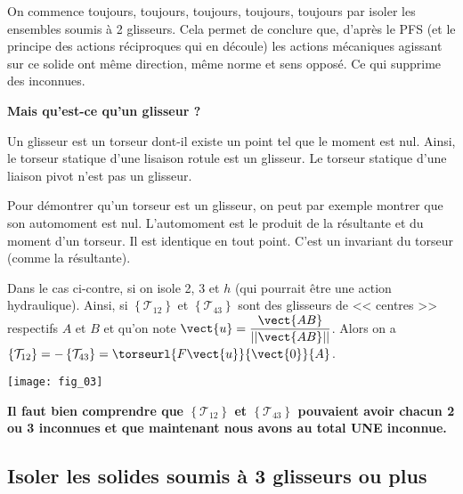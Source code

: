 On commence toujours, \large{toujours}, \Large{toujours}, \LARGE{toujours}, \huge{toujours} \normalsize par isoler les ensembles soumis à 2 glisseurs. Cela permet de conclure que, d'après le PFS (et le principe des actions réciproques qui en découle) les actions mécaniques agissant sur ce solide ont même direction, même norme et sens opposé. Ce qui supprime des inconnues.

\textbf{Mais qu'est-ce qu'un glisseur ?}

Un glisseur est un torseur dont-il existe un point tel que le moment est nul. Ainsi, le torseur statique d'une lisaison rotule est un glisseur. Le torseur statique d'une liaison pivot n'est pas un glisseur. 




\begin{remarque}
Pour démontrer qu'un torseur est un glisseur, on peut par exemple montrer que son automoment est nul. L'automoment est le produit de la résultante et du moment d'un torseur. Il est identique en tout point. C'est un invariant du torseur (comme la résultante).
\end{remarque}


Dans le cas ci-contre, si on isole 2, 3 et $h$ (qui pourrait être une action hydraulique). Ainsi, si $\left\{\mathcal{T}_{12}\right\}$ et $\left\{\mathcal{T}_{43}\right\}$ sont des glisseurs de << centres >> respectifs $A$ et $B$ et qu'on note $\vect{u}=\dfrac{\vect{AB}}{||\vect{AB}||}$. Alors on a $\left\{\mathcal{T}_{12}\right\}=-\left\{\mathcal{T}_{43}\right\}=\torseurl{F\vect{u}}{\vect{0}}{A}$. 
\begin{marginfigure}
\texttt{[image: fig\_03]}
\end{marginfigure}


\textbf{Il faut bien comprendre que $\left\{\mathcal{T}_{12}\right\}$ et $\left\{\mathcal{T}_{43}\right\}$  pouvaient avoir chacun 2 ou 3 inconnues et que maintenant nous avons au total UNE inconnue.}


\subsection{Isoler les solides soumis à 3 glisseurs ou plus}

